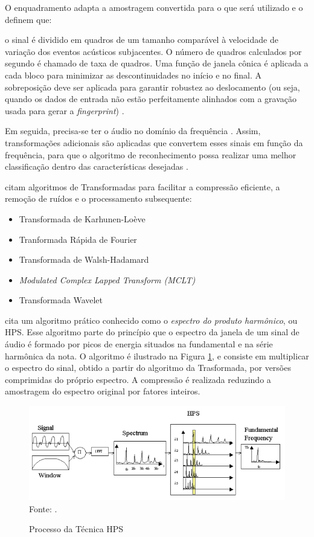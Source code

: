 O enquadramento adapta a amostragem convertida para o que será utilizado e  o definem que:

\begin{citacao}
[...]o sinal é dividido em quadros de um tamanho comparável à velocidade de variação dos eventos acústicos subjacentes. O número de quadros calculados por segundo é chamado de taxa de quadros. Uma função de janela cônica é aplicada a cada bloco para minimizar as descontinuidades no início e no final. A sobreposição deve ser aplicada para garantir robustez ao deslocamento (ou seja, quando os dados de entrada não estão perfeitamente alinhados com a gravação usada para gerar a \textit{fingerprint}) \cite{cano2005}.
\end{citacao}

Em seguida, precisa-se ter o áudio no domínio da frequência \cite{bunnell1996a}. Assim, transformações adicionais são aplicadas que convertem esses sinais em função da frequência, para que o algoritmo de reconhecimento possa realizar uma melhor classificação dentro das características desejadas \cite{santos2011}.

 citam algoritmos de Transformadas para facilitar a compressão eficiente, a remoção de ruídos e o processamento subsequente:

\begin{itemize}
    \item Transformada de Karhunen-Loève
    \item Tranformada Rápida de Fourier
    \item Transformada de Walsh-Hadamard
    \item \textit{Modulated Complex Lapped Transform (MCLT)}
    \item Transformada Wavelet
\end{itemize}

 cita um algoritmo prático conhecido como o \textit{espectro do produto harmônico}, ou HPS. Esse algoritmo parte do princípio que o espectro da janela de um sinal de áudio é formado por picos de energia situados na fundamental e na série harmônica da nota. O algoritmo é ilustrado na Figura \ref{fig:hps}, e consiste em multiplicar o espectro do sinal, obtido a partir do algoritmo da Trasformada, por versões comprimidas do próprio espectro. A compressão é realizada reduzindo a amostragem do espectro original por fatores inteiros.

\begin{figure}[!htb]
   \centering
   \caption{Processo da Técnica HPS}\label{fig:hps} 
   \includegraphics[scale=0.62]{figuras/hps.png}
   \\Fonte: \cite{santos2011}.
\end{figure}

